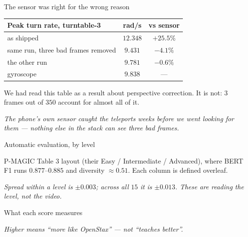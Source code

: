\documentclass[aspectratio=169,10pt]{beamer}
\newcommand{\takeaway}[1]{\vfill{\footnotesize\itshape\color{cGrey}#1\par}}
\begin{document}
\begin{frame}{The sensor was right for the wrong reason}
\vfill
\begin{center}
\small
\renewcommand{\arraystretch}{1.4}
\begin{tabular}{@{}lcc@{}}
\toprule
\rowcolor{cMeas!12}
\textbf{Peak turn rate, turntable-3} & \textbf{rad/s} & \textbf{vs sensor} \\
\midrule
as shipped & $12.348$ & {\color{cAccent}$+25.5\%$} \\
\rowcolor{cApp!10}
same run, three bad frames removed & $9.431$ & $\mathbf{-4.1\%}$ \\
the other run & $9.781$ & $-0.6\%$ \\
\midrule
gyroscope & $9.838$ & --- \\
\bottomrule
\end{tabular}
\end{center}
\vfill
\begin{center}
{\footnotesize We had read this table as a result about perspective correction. It is not:
$3$ frames out of $350$ account for almost all of it.}
\end{center}
\takeaway{The phone's own sensor caught the teleports weeks before we went looking for them ---
nothing else in the stack can see three bad frames.}
\end{frame}

\begin{frame}{Automatic evaluation, by level}
\vfill
\begin{center}
\scriptsize
\renewcommand{\arraystretch}{1.15}
\resizebox{\textwidth}{!}{\pmagicAuto}
\end{center}
\vfill
\begin{center}
{\scriptsize P-MAGIC Table 3 layout (their Easy / Intermediate / Advanced), where BERT F1 runs
$0.877$--$0.885$ and diversity $\approx 0.51$. Each column is defined overleaf.}
\end{center}
\takeaway{Spread \emph{within} a level is $\pm 0.003$; across all $15$ it is $\pm 0.013$. These
are reading the level, not the video.}
\end{frame}

\begin{frame}{What each score measures}
\begin{center}
\scriptsize
\renewcommand{\arraystretch}{1.0}
\pmagicMetricDefs
\end{center}
\takeaway{Higher means ``more like OpenStax'' --- not ``teaches better''.}
\end{frame}
\end{document}
